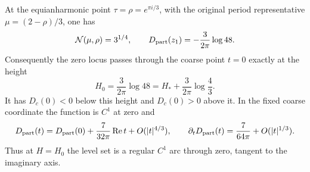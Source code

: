 \begin{proposition}\hypertarget{tag-032N}{}\label{push:src:D.4.5}

At the equianharmonic point \(\tau=\rho=e^{\pi i/3}\), with the
original period representative \(\mu=(2-\rho)/3\), one has
\[
 \mathcal N(\mu,\rho)=3^{1/4},\qquad
 D_{\rm part}(z_1)=-\frac3{2\pi}\log48.
\]
Consequently the zero locus passes through the coarse point \(t=0\)
exactly at the height
\[
 H_0=\frac3{2\pi}\log48
 =H_*+\frac3{2\pi}\log\frac43.
\]
It has \(D_c(0)<0\) below this height and \(D_c(0)>0\) above it.
In the fixed coarse coordinate the function is \(C^1\) at zero and
\[
 D_{\rm part}(t)=D_{\rm part}(0)
       +\frac7{32\pi}\operatorname{Re}t+O(|t|^{4/3}),\qquad
 \partial_tD_{\rm part}(t)=\frac7{64\pi}+O(|t|^{1/3}).
\]
Thus at \(H=H_0\) the level set is a regular \(C^1\) arc through
zero, tangent to the imaginary axis.
\end{proposition}


